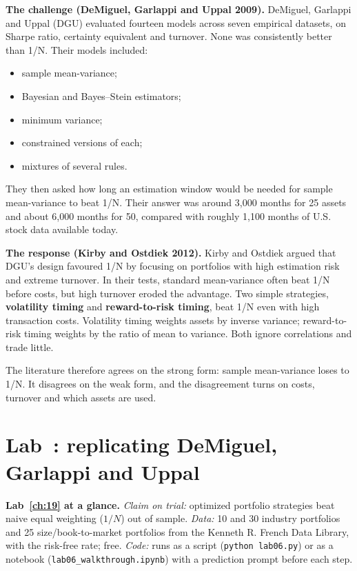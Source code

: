 \textbf{The challenge (DeMiguel, Garlappi and Uppal 2009).} DeMiguel, Garlappi and Uppal (DGU) evaluated fourteen models across seven empirical datasets, on Sharpe ratio, certainty equivalent and turnover. None was consistently better than 1/N. Their models included:

\begin{itemize}
  \item sample mean-variance;
  \item Bayesian and Bayes--Stein estimators;
  \item minimum variance;
  \item constrained versions of each;
  \item mixtures of several rules.
\end{itemize}

They then asked how long an estimation window would be needed for sample mean-variance to beat 1/N. Their answer was around 3,000 months for 25 assets and about 6,000 months for 50, compared with roughly 1,100 months of U.S. stock data available today.

\textbf{The response (Kirby and Ostdiek 2012).} Kirby and Ostdiek argued that DGU's design favoured 1/N by focusing on portfolios with high estimation risk and extreme turnover. In their tests, standard mean-variance often beat 1/N before costs, but high turnover eroded the advantage. Two simple strategies, \textbf{volatility timing} and \textbf{reward-to-risk timing}, beat 1/N even with high transaction costs. Volatility timing weights assets by inverse variance; reward-to-risk timing weights by the ratio of mean to variance. Both ignore correlations and trade little.

The literature therefore agrees on the strong form: sample mean-variance loses to 1/N. It disagrees on the weak form, and the disagreement turns on costs, turnover and which assets are used.

\section{Lab~\thechapter: replicating DeMiguel, Garlappi and Uppal}
\label{sec:19-lab}

\begin{callout}
\textbf{Lab~\ref{ch:19} at a glance.} \emph{Claim on trial:} optimized portfolio strategies beat naive equal weighting ($1/N$) out of sample. \emph{Data:} 10 and 30 industry portfolios and 25 size/book-to-market portfolios from the Kenneth R. French Data Library, with the risk-free rate; free. \emph{Code:} runs as a script (\texttt{python lab06.py}) or as a notebook (\texttt{lab06\_walkthrough.ipynb}) with a prediction prompt before each step.
\end{callout}

